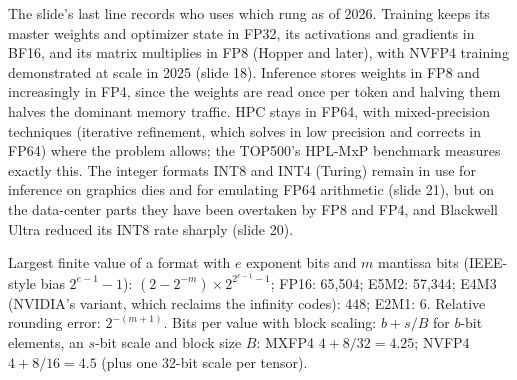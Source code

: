 \documentclass[11pt,letterpaper]{article}
\newenvironment{formulas}{\begin{tcolorbox}[formulabox]}{\end{tcolorbox}}
\begin{document}
The slide's last line records who uses which rung as of 2026. Training keeps its master weights and optimizer state in FP32, its activations and gradients in BF16, and its matrix multiplies in FP8 (Hopper and later), with NVFP4 training demonstrated at scale in 2025 (slide 18). Inference stores weights in FP8 and increasingly in FP4, since the weights are read once per token and halving them halves the dominant memory traffic. HPC stays in FP64, with mixed-precision techniques (iterative refinement, which solves in low precision and corrects in FP64) where the problem allows; the TOP500's HPL-MxP benchmark measures exactly this. The integer formats INT8 and INT4 (Turing) remain in use for inference on graphics dies and for emulating FP64 arithmetic (slide 21), but on the data-center parts they have been overtaken by FP8 and FP4, and Blackwell Ultra reduced its INT8 rate sharply (slide 20).

\begin{formulas}
Largest finite value of a format with $e$ exponent bits and $m$ mantissa bits (IEEE-style bias $2^{e-1}-1$): $(2 - 2^{-m}) \times 2^{2^{e-1}-1}$; FP16: 65,504; E5M2: 57,344; E4M3 (NVIDIA's variant, which reclaims the infinity codes): 448; E2M1: 6.
Relative rounding error: $2^{-(m+1)}$. Bits per value with block scaling: $b + s/B$ for $b$-bit elements, an $s$-bit scale and block size $B$: MXFP4 $4 + 8/32 = 4.25$; NVFP4 $4 + 8/16 = 4.5$ (plus one 32-bit scale per tensor).
\end{formulas}
\end{document}
